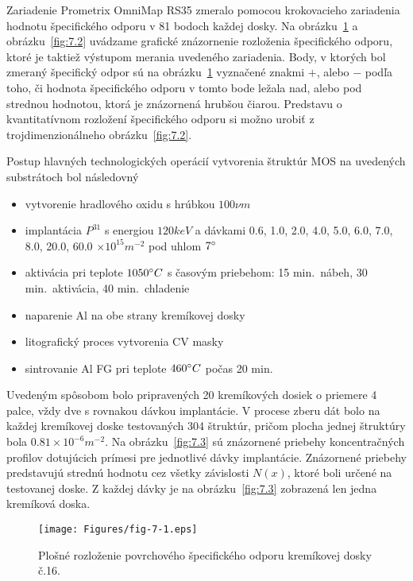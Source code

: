 Zariadenie Prometrix OmniMap RS35 zmeralo pomocou krokovacieho
zariadenia hodnotu špecifického odporu v 81 bodoch každej dosky. Na
obrázku~\ref{fig:7.1} a obrázku~\ref{fig:7.2} uvádzame grafické
znázornenie rozloženia špecifického odporu, ktoré je taktiež výstupom
merania uvedeného zariadenia. Body, v ktorých bol zmeraný špecifický
odpor sú na obrázku~\ref{fig:7.1} vyznačené znakmi $+$, alebo $-$
podľa toho, či hodnota špecifického odporu v tomto bode ležala nad,
alebo pod strednou hodnotou, ktorá je znázornená hrubšou čiarou.
Predstavu o kvantitatívnom rozložení špecifického odporu si možno
urobiť z trojdimenzionálneho obrázku~\ref{fig:7.2}.

Postup hlavných technologických operácií vytvorenia štruktúr MOS na
uvedených substrátoch bol následovný

\begin{itemize}
\item vytvorenie hradlového oxidu s hrúbkou $100 \nu m$
\item implantácia $P^{31}$ s energiou $120 keV$ a dávkami 0.6, 1.0,
  2.0, 4.0, 5.0, 6.0, 7.0, 8.0, 20.0, 60.0 $\times 10^{15} m^{-2}$ pod
  uhlom $7\degree$
\item aktivácia pri teplote $1050 \degree C$ s časovým priebehom: 15
  min.\ nábeh, 30 min.\ aktivácia, 40 min.\ chladenie
\item naparenie Al na obe strany kremíkovej dosky
\item litografický proces vytvorenia CV masky
\item sintrovanie Al FG pri teplote $460 \degree C$ počas 20 min.
\end{itemize}

Uvedeným spôsobom bolo pripravených 20 kremíkových dosiek o priemere 4
palce, vždy dve s rovnakou dávkou implantácie.  V procese zberu dát
bolo na každej kremíkovej doske testovaných 304 štruktúr, pričom
plocha jednej štruktúry bola $0.81 \times 10^{-6} m^{-2}$. Na
obrázku~\ref{fig:7.3} sú znázornené priebehy koncentračných profilov
dotujúcich prímesi pre jednotlivé dávky implantácie. Znázornené
priebehy predstavujú strednú hodnotu cez všetky závislosti $N(x)$,
ktoré boli určené na testovanej doske. Z každej dávky je na
obrázku~\ref{fig:7.3} zobrazená len jedna kremíková doska.

\newpage
\begin{figure}[h!]\centering
  \begin{minipage}[c]{\myfiguresize}
    \begin{center}
      \texttt{[image: Figures/fig-7-1.eps]}%
    \end{center}
    \caption[Plošné rozloženie povrchového špecifického odporu
      kremíkovej dosky č.16]{Plošné rozloženie povrchového
      špecifického odporu kremíkovej dosky č.16.}\label{fig:7.1}
  \end{minipage}
\end{figure}

